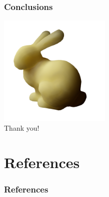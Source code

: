 \documentclass{beamer}
\begin{document}
\begin{frame}
    \frametitle{Conclusions}
\centering
\includegraphics[width=0.4\textwidth]{front} \\
\huge Thank you!
\end{frame}

\section{References}

\begin{frame}
    \frametitle{References}
 
\end{frame}
\end{document}
